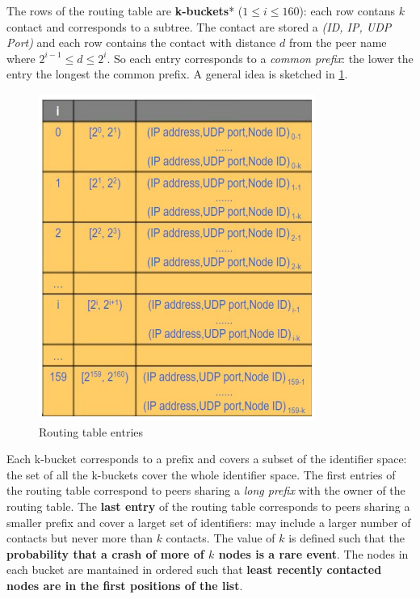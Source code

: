 \documentclass[10pt,a4paper]{report}
\begin{document}
The rows of the routing table are \textbf{k-buckets}* ($1 \leq i \leq 160$): each row contans $k$ contact and corresponds to a subtree. The contact are stored a \textit{(ID, IP, UDP Port)} and each row contains the contact with distance $d$ from the peer name where $2^{i-1} \leq d \le 2^{i}$. So each entry corresponds to a \textit{common prefix}: the lower the entry the longest the common prefix. A general idea is sketched in \ref{routing-entry}.
\begin{figure}[h]
	\centering
	\centering
	\includegraphics[scale=0.40]{images/Pasted image 20230304110327.png}
	\caption{Routing table entries}
	\label{routing-entry}
\end{figure}

Each k-bucket corresponds to a prefix and covers a subset of the identifier space: the set of all the k-buckets cover the whole identifier space. The first entries of the routing table correspond to peers sharing a \textit{long prefix} with the owner of the routing table.
The \textbf{last entry} of the routing table corresponds to peers sharing a smaller prefix and cover a larget set of identifiers: may include a larger number of contacts but never more than $k$ contacts.
The value of $k$ is defined such that the \textbf{probability that a crash of more of $k$ nodes is a rare event}.
The nodes in each bucket are mantained in ordered such that \textbf{least recently contacted nodes are in the first positions of the list}.
\end{document}
